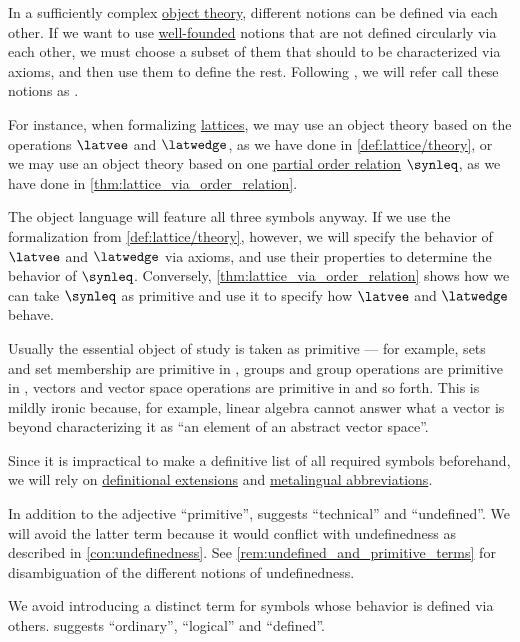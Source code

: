 \begin{concept}\label{con:primitive_notion}
  In a sufficiently complex \hyperref[con:metalogic]{object theory}, different notions can be defined via each other. If we want to use \hyperref[def:well_founded_relation]{well-founded} notions that are not defined circularly via each other, we must choose a subset of them that should to be characterized via axioms, and then use them to define the rest. Following \textcite[28]{Kleene1971Metamathematics}, we will refer call these notions as .

  For instance, when formalizing \hyperref[def:lattice]{lattices}, we may use an object theory based on the operations \( {\latvee} \) and \( {\latwedge} \), as we have done in \cref{def:lattice/theory}, or we may use an object theory based on one \hyperref[def:partially_ordered_set]{partial order relation} \( {\synleq} \), as we have done in \cref{thm:lattice_via_order_relation}.

  The object language will feature all three symbols anyway. If we use the formalization from \cref{def:lattice/theory}, however, we will specify the behavior of \( {\latvee} \) and \( {\latwedge} \) via axioms, and use their properties to determine the behavior of \( {\synleq} \). Conversely, \cref{thm:lattice_via_order_relation} shows how we can take \( {\synleq} \) as primitive and use it to specify how \( {\latvee} \) and \( {\latwedge} \) behave.

  Usually the essential object of study is taken as primitive --- for example, sets and set membership are primitive in , groups and group operations are primitive in , vectors and vector space operations are primitive in  and so forth. This is mildly ironic because, for example, linear algebra cannot answer what a vector is beyond characterizing it as \enquote{an element of an abstract vector space}.

  Since it is impractical to make a definitive list of all required symbols beforehand, we will rely on \hyperref[def:fol_definitional_extension]{definitional extensions} and \hyperref[con:syntactic_abbreviation]{metalingual abbreviations}.
\end{concept}
\begin{comments}
  \item In addition to the adjective \enquote{primitive}, \textcite[28]{Kleene1971Metamathematics} suggests \enquote{technical} and \enquote{undefined}. We will avoid the latter term because it would conflict with undefinedness as described in \cref{con:undefinedness}. See \cref{rem:undefined_and_primitive_terms} for disambiguation of the different notions of undefinedness.

  \item We avoid introducing a distinct term for symbols whose behavior is defined via others. \Textcite[28]{Kleene1971Metamathematics} suggests \enquote{ordinary}, \enquote{logical} and \enquote{defined}.
\end{comments}

